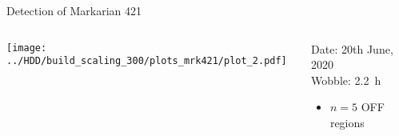\begin{frame}{Detection of Markarian 421}
    \begin{columns}[onlytextwidth]
        \begin{column}{0.64\textwidth}
            \centering
            \texttt{[image: ../HDD/build\_scaling\_300/plots\_mrk421/plot\_2.pdf]}
        \end{column}
        \begin{column}{0.35\textwidth}
            \hspace{0.3cm}\textcolor{tugreen}{Date:} 20th June, 2020\\
            \hspace{0.3cm}\textcolor{tugreen}{Wobble:} \SI{2.2}{\hour}\\
            \medskip
            \begin{itemize}
                \item $n = \num{5}$ OFF regions
            \end{itemize}
        \end{column}
    \end{columns}

\end{frame}